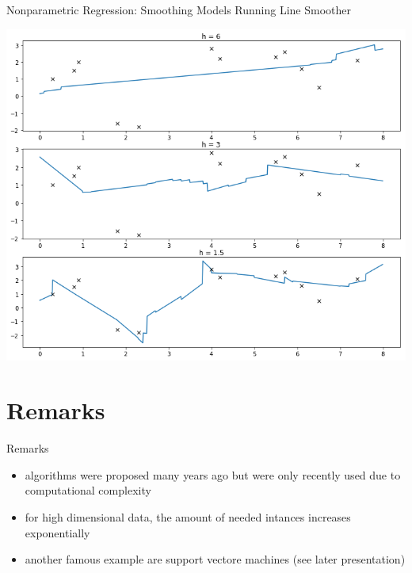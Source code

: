 \documentclass{beamer}
\begin{document}
\begin{frame}[fragile]{Nonparametric Regression: Smoothing Models}
  Running Line Smoother
  \begin{center}
    \includegraphics[height=0.8\textheight]{images/running_line_smoother.png}
  \end{center}
\end{frame}


\section{Remarks}

\begin{frame}[fragile]{Remarks}
  \begin{itemize}
    \item algorithms were proposed many years ago but were only recently used due to computational complexity
    \item for high dimensional data, the amount of needed intances increases exponentially
    \item another famous example are support vectore machines (see later presentation)
  \end{itemize}
  
\end{frame}
\end{document}
